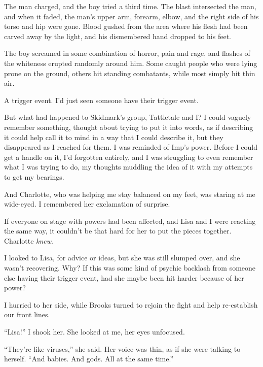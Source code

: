 The man charged, and the boy tried a third time.  The blast intersected the man, and when it faded, the man's upper arm, forearm, elbow, and the right side of his torso and hip were gone.  Blood gushed from the area where his flesh had been carved away by the light, and his dismembered hand dropped to his feet.



The boy screamed in some combination of horror, pain and rage, and flashes of the whiteness erupted randomly around him.  Some caught people who were lying prone on the ground, others hit standing combatants, while most simply hit thin air.



A trigger event.  I'd just seen someone have their trigger event.



But what had happened to Skidmark's group, Tattletale and I?  I could vaguely remember something, thought about trying to put it into words, as if describing it could help call it to mind in a way that I could describe it, but they disappeared as I reached for them.  I was reminded of Imp's power.  Before I could get a handle on it, I'd forgotten entirely, and I was struggling to even remember what I was trying to do, my thoughts muddling the idea of it with my attempts to get my bearings.



And Charlotte, who was helping me stay balanced on my feet, was staring at me wide-eyed.  I remembered her exclamation of surprise.



If everyone on stage with powers had been affected, and Lisa and I were reacting the same way, it couldn't be that hard for her to put the pieces together.  Charlotte \emph{knew}.



I looked to Lisa, for advice or ideas, but she was still slumped over, and she wasn't recovering.  Why?  If this was some kind of psychic backlash from someone else having their trigger event, had she maybe been hit harder because of her power?



I hurried to her side, while Brooks turned to rejoin the fight and help re-establish our front lines.



``Lisa!'' I shook her.  She looked at me, her eyes unfocused.



``They're like viruses,'' she said.  Her voice was thin, as if she were talking to herself.  ``And babies.  And gods.  All at the same time.''



